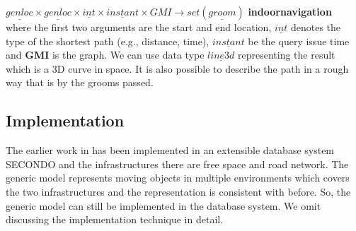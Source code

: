 $\underline{genloc} \times \underline{genloc} \times \underline{int} \times \underline{instant} \times GMI\rightarrow set(\underline{groom})$ \hspace{0.3cm} \textbf{indoornavigation} \\

where the first two arguments are the start and end location, $\underline{int}$ denotes the type of the shortest path (e.g., distance, time), $\underline{instant}$ be the query issue time and \textbf{GMI} is the graph. We can use data type $\underline{line3d}$ representing the result which is a 3D curve in space. It is also possible to describe the path in a rough way that is by the grooms passed. 

\subsection{Implementation}
\label{sec:implementation}
The earlier work in \cite{FG+00,GA2006} has been implemented in an extensible database system SECONDO \cite{GAABDHHS05} and the infrastructures there are free space and road network. The generic model represents moving objects in multiple environments which covers the two infrastructures and the representation is consistent with 
before. So, the generic model can still be implemented in the database system. We omit discussing the implementation technique in detail. 
